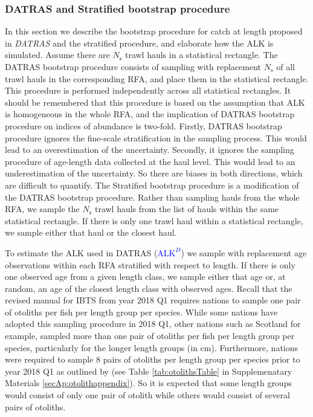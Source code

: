 \documentclass[a4paper 12pt]{article}
\numberwithin{equation}{section}
\newcommand{\nat}[1]{\textcolor{blue}{#1}}
\begin{document}
\subsubsection{DATRAS and Stratified bootstrap procedure}
\label{sec:datrasstratifiedbootstrap}
In this section we describe the bootstrap procedure for catch at length proposed in \emph{DATRAS} \citet{ICES2006Report} and the stratified procedure, and elaborate how the ALK is simulated. Assume there are $N_{\text{s}}$ trawl hauls in a statistical rectangle. The DATRAS bootstrap procedure consists of sampling with replacement $N_{\text{s}}$ of all trawl hauls in the corresponding RFA, and place them in the statistical rectangle. This procedure is performed independently across all statistical rectangles. It should be remembered that this procedure is based on the assumption that ALK is homogeneous in the whole RFA, and the implication of DATRAS bootstrap procedure on indices of abundance is two-fold. Firstly, DATRAS bootstrap procedure ignores the fine-scale stratification in the sampling process. This would lead to an overestimation of the uncertainty. Secondly, it ignores the sampling procedure of age-length data collected at the haul level. This would lead  to an underestimation of the uncertainty. So there are biases in both directions, which are difficult to quantify. The Stratified bootstrap procedure is a modification of the DATRAS bootstrap procedure. Rather than sampling hauls from the whole RFA, we  sample the $N_{\text{s}}$ trawl hauls from the list of hauls within the same statistical rectangle. If there is only one trawl haul within a statistical rectangle, we sample either that haul or the closest haul.

To estimate the ALK used in DATRAS (\nat{$\mathrm{ALK}^{D}$}) we sample with replacement age observations within each RFA stratified with respect to length. If there is only one observed age from a given length class, we sample either that age or, at random, an age of the closest length class with observed ages. Recall that the revised manual for IBTS from year 2018 Q1 requires nations to sample one pair of otoliths per fish per length group per species. While some nations have adopted this sampling procedure in 2018 Q1, other nations such as Scotland for example, sampled more than one pair of otoliths per fish per length group per species, particularly for the longer length groups (in cm). Furthermore, nations were required to sample 8 pairs of otoliths per length group per species prior to year 2018 Q1 as outlined by \citet{ICES2006Report} (see Table \ref{tab:otolithsTable} in Supplemenatary Materials \ref{secAp:otolithappendix}). So it is expected that some length groups would consist of only one pair of otolith while others would consist of several pairs of otoliths. 
\end{document}
